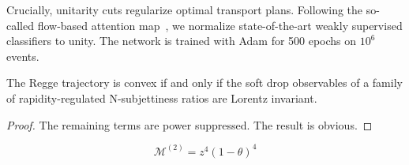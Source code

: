 Crucially, unitarity cuts regularize optimal transport plans. Following
the so-called flow-based attention
map~\cite{TPC:0206-The-Many-Faces-of-the-Spectral-Energy-Movers-Distance-September-27-2026},
we normalize state-of-the-art weakly supervised classifiers to unity.
The network is trained with Adam for 500 epochs on $10^6$ events.

\begin{proposition}\label{thm:3}
The Regge trajectory is convex if and only if the soft drop observables
of a family of rapidity-regulated N-subjettiness ratios are Lorentz
invariant.
\end{proposition}

\begin{proof}
The remaining terms are power suppressed. The result is obvious.
\end{proof}

\begin{equation}
  \mathcal{M}^{(2)} = {z}^{4} (1 - \theta)^{4}
  \label{eq:2}
\end{equation}

